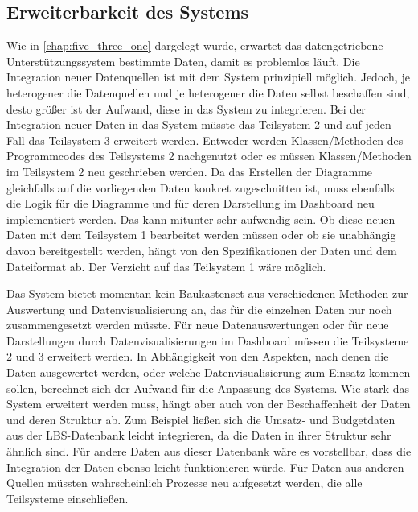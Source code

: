     \subsection{Erweiterbarkeit des Systems}
    Wie in \autoref{chap:five_three_one} dargelegt wurde, erwartet das datengetriebene Unterstützungssystem bestimmte Daten,
    damit es problemlos läuft. Die Integration neuer Datenquellen ist mit dem System prinzipiell möglich. 
    Jedoch, je heterogener die Datenquellen und je heterogener die Daten selbst beschaffen sind, 
    desto größer ist der Aufwand, diese in das System zu integrieren. Bei der Integration neuer Daten in 
    das System müsste das Teilsystem 2 und auf jeden Fall das Teilsystem 3 erweitert werden.
    Entweder werden Klassen/Methoden des Programmcodes des Teilsystems 2 nachgenutzt oder es 
    müssen Klassen/Methoden im Teilsystem 2 neu geschrieben werden. Da das Erstellen der Diagramme gleichfalls auf die vorliegenden 
    Daten konkret zugeschnitten ist, muss ebenfalls die Logik für die Diagramme und für deren Darstellung im Dashboard
    neu implementiert werden. Das kann mitunter sehr aufwendig sein. Ob diese neuen Daten mit dem Teilsystem 1 bearbeitet
    werden müssen oder ob sie unabhängig davon bereitgestellt werden, hängt von den Spezifikationen der Daten und dem
    Dateiformat ab. Der Verzicht auf das Teilsystem 1 wäre möglich.

    Das System bietet momentan kein Baukastenset aus verschiedenen Methoden zur Auswertung 
    und Datenvisualisierung an, das für die einzelnen Daten nur noch zusammengesetzt
    werden müsste. Für neue Datenauswertungen oder für neue Darstellungen durch Datenvisualisierungen 
    im Dashboard müssen die Teilsysteme 2 und 3 erweitert werden. In Abhängigkeit von den Aspekten, nach denen
    die Daten ausgewertet werden, oder welche Datenvisualisierung zum Einsatz kommen sollen,
    berechnet sich der Aufwand für die Anpassung des Systems. 
    Wie stark das System erweitert werden muss, hängt aber auch von der Beschaffenheit der Daten und deren Struktur ab. 
    Zum Beispiel ließen sich die Umsatz- und Budgetdaten aus der LBS-Datenbank leicht integrieren, da die Daten 
    in ihrer Struktur sehr ähnlich sind. Für andere Daten aus dieser Datenbank wäre es vorstellbar,
    dass die Integration der Daten ebenso leicht funktionieren würde. Für Daten aus anderen Quellen
    müssten wahrscheinlich Prozesse neu aufgesetzt werden, die alle Teilsysteme einschließen.


